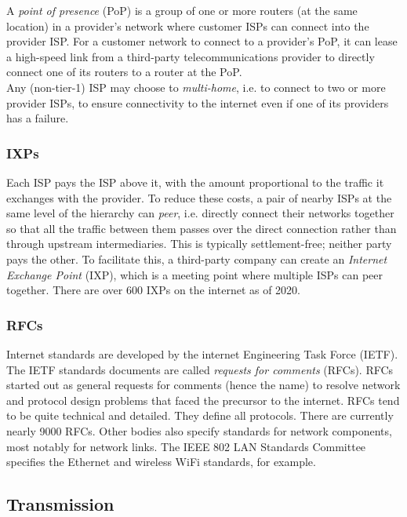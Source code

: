 \documentclass[table, xcdraw]{article}%
\begin{document}
A \emph{point of presence} (PoP) is a group of one or more routers (at the same location) in a provider’s network where customer ISPs can connect into the provider ISP. For a customer network to connect to a provider’s PoP, it can lease a high-speed link from a third-party telecommunications provider to directly connect one of its routers to a router at the PoP.\\
Any (non-tier-1) ISP may choose to \emph{multi-home}, i.e. to connect to two or more provider ISPs, to ensure connectivity to the internet even if one of its providers has a failure.

\subsubsection{IXPs} \label{IXPs}

Each ISP pays the ISP above it, with the amount proportional to the traffic it exchanges with the provider. To reduce these costs, a pair of nearby ISPs at the same level of the hierarchy can \emph{peer}, i.e. directly connect their networks together so that all the traffic between them passes over the direct connection rather than through upstream intermediaries. This is typically settlement-free; neither party pays the other. To facilitate this, a third-party company can create an \emph{Internet Exchange Point} (IXP), which is a meeting point where multiple ISPs can peer together. There are over 600 IXPs on the internet as of 2020.

\subsubsection{RFCs}

Internet standards are developed by the internet Engineering Task Force (IETF). The IETF standards documents are called \emph{requests for comments} (RFCs). RFCs started out as general requests for comments (hence the name) to resolve network and protocol design problems that faced the precursor to the internet. RFCs tend to be quite technical and detailed. They define all protocols. There are currently nearly 9000 RFCs. Other bodies also specify standards for network components, most notably for network links. The IEEE 802 LAN Standards Committee specifies the Ethernet and wireless WiFi standards, for example.

\subsection{Transmission}
\end{document}
